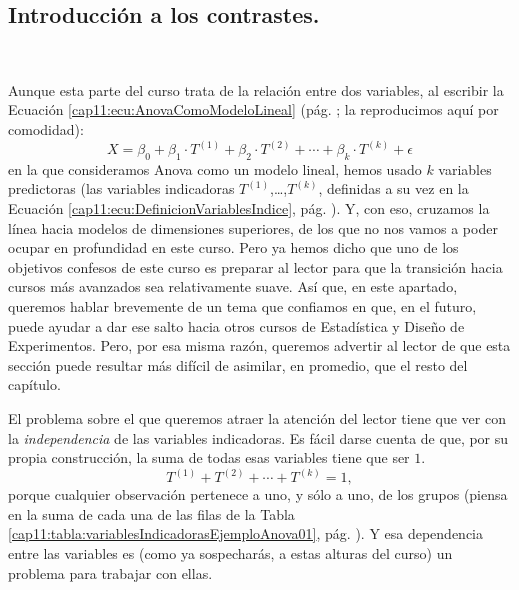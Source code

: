 \subsection{Introducción a los contrastes.}
\label{cap11:subsubsec:IntroduccionContrastes}

\\

Aunque esta parte del curso trata de la relación entre dos variables, al escribir la Ecuación
\ref{cap11:ecu:AnovaComoModeloLineal} (pág. \pageref{cap11:ecu:AnovaComoModeloLineal}; la reproducimos aquí por comodidad):
    \begin{equation}
    \label{cap11:ecu:AnovaComoModeloLinealRepetida}
        X=\beta_0+\beta_1\cdot T^{(1)}+\beta_2\cdot T^{(2)}+\cdots+\beta_k\cdot T^{(k)}+\epsilon
    \end{equation}
en la que consideramos Anova como un modelo lineal, hemos usado $k$ variables
predictoras (las variables indicadoras $T^{(1)}$,\ldots,$T^{(k)}$, definidas a su vez en la Ecuación \ref{cap11:ecu:DefinicionVariablesIndice}, pág. \pageref{cap11:ecu:DefinicionVariablesIndice}). Y, con eso, cruzamos la línea hacia modelos de dimensiones superiores, de los que no nos vamos a poder ocupar en profundidad en este curso. Pero ya hemos dicho que uno de los objetivos confesos de este curso es preparar al lector para que la transición hacia cursos más avanzados sea relativamente suave. Así que, en este
apartado, queremos hablar brevemente de un tema que confiamos en que, en el futuro, puede ayudar a dar ese salto hacia otros cursos de Estadística y Diseño de Experimentos. Pero, por esa misma razón, queremos advertir al lector de que esta sección puede resultar más difícil de asimilar, en promedio, que el resto del capítulo.

El problema sobre el que queremos atraer la atención del lector tiene que ver con la {\em
independencia} de las variables indicadoras. Es fácil darse cuenta de que, por su propia
construcción, la suma de todas esas variables tiene que ser $1$.
\[
T^{(1)}+T^{(2)}+\cdots+T^{(k)}=1,
\]
porque cualquier observación pertenece a uno, y sólo a uno, de los grupos (piensa en  la suma de cada
una de las filas de la Tabla \ref{cap11:tabla:variablesIndicadorasEjemploAnova01}, pág. \pageref{cap11:tabla:variablesIndicadorasEjemploAnova01}). Y esa
dependencia entre las variables es (como ya sospecharás, a estas alturas del curso) un problema
para trabajar con ellas.

